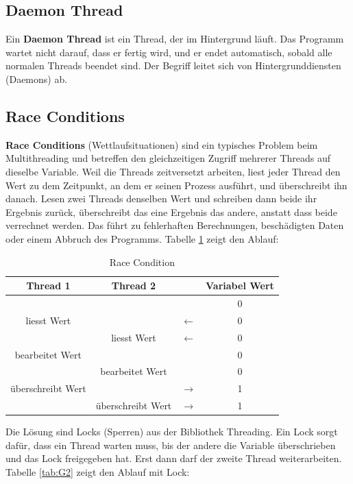 \subsection{Daemon Thread}

Ein \textbf{Daemon Thread} ist ein Thread, der im Hintergrund läuft. Das Programm wartet nicht darauf, dass er fertig wird, und er endet automatisch, sobald alle normalen Threads beendet sind. Der Begriff leitet sich von Hintergrunddiensten (Daemons) ab.

\subsection{Race Conditions}

\textbf{Race Conditions} (Wettlaufsituationen) sind ein typisches Problem beim Multithreading und betreffen den gleichzeitigen Zugriff mehrerer Threads auf dieselbe Variable.\citep{RaceCondition2026} Weil die Threads zeitversetzt arbeiten, liest jeder Thread den Wert zu dem Zeitpunkt, an dem er seinen Prozess ausführt, und überschreibt ihn danach. Lesen zwei Threads denselben Wert und schreiben dann beide ihr Ergebnis zurück, überschreibt das eine Ergebnis das andere, anstatt dass beide verrechnet werden. Das führt zu fehlerhaften Berechnungen, beschädigten Daten oder einem Abbruch des Programms. Tabelle \ref{tab:G1} zeigt den Ablauf:

\begin{table}[H]
    \centering
    \begin{tabular}{|c|c|c|c|}\hline
         Thread 1&  Thread 2&  & Variabel Wert\\\hline
         &  &  & 0\\\hline
         liesst Wert&  &  \(\longleftarrow\) & 0\\\hline
         &  liesst Wert& \(\longleftarrow\) & 0\\\hline
         bearbeitet Wert&  &  & 0\\\hline
         &  bearbeitet Wert&  & 0\\\hline
         überschreibt Wert&  &  \(\longrightarrow\)& 1\\\hline
         &  überschreibt Wert&  \(\longrightarrow\)& 1\\ \hline
    \end{tabular}
    \caption{Race Condition \cite{RaceCondition2026}}
    \label{tab:G1}
\end{table}

Die Lösung sind Locks (Sperren) aus der Bibliothek Threading. Ein Lock sorgt dafür, dass ein Thread warten muss, bis der andere die Variable überschrieben und das Lock freigegeben hat. Erst dann darf der zweite Thread weiterarbeiten. Tabelle \ref{tab:G2} zeigt den Ablauf mit Lock:

